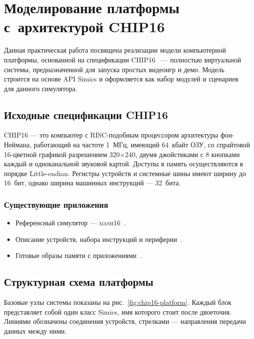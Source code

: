 \chapter{Моделирование платформы с~архитектурой CHIP16}\label{chap:lab05}

Данная практическая работа посвящена реализации модели компьютерной платформы, основанной на спецификации CHIP16~\cite{chip16-ngemu} --- полностью виртуальной системы, предназначенной для запуска простых видеоигр и демо. Модель строится на основе API Simics и оформляется как набор модулей и сценариев для данного симулятора.

\section{Исходные спецификации CHIP16}

CHIP16 --- это компьютер с RISC-подобным процессором архитектуры фон-Неймана, работающий на частоте 1~МГц, имеющий 64~кбайт ОЗУ, со спрайтовой 16-цветной графикой разрешением 320×240, двумя джойстиками с 8 кнопками каждый и одноканальной звуковой картой. Доступы в память осуществляются в порядке Little-endian. Регистры устройств и системные шины имеют ширину до 16~бит, однако ширина машинных инструкций — 32~бита.

\subsection{Существующие приложения}

\begin{itemize}
    \item Референсный симулятор --- \textsc{mash16}~\cite{chip16-mach16}.
    \item Описание устройств, набора инструкций и периферии~\cite{chip16-machspec}.
    \item Готовые образы памяти с приложениями~\cite{chip16-roms}.
\end{itemize}

\section{Структурная схема платформы}

Базовые узлы системы показаны на рис.~\ref{fig:chip16-platform}. Каждый блок представляет собой один класс Simics, имя которого стоит после двоеточия. Линиями обозначены соединения устройств, стрелками — направления передачи данных между ними.

